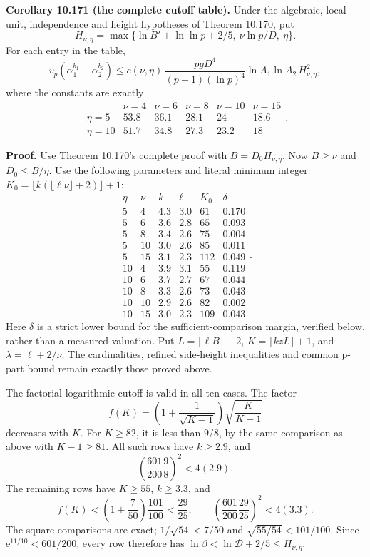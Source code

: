 \documentclass[
  11pt,
  a4paper,
]{article}
\begin{document}
\textbf{Corollary 10.171 (the complete cutoff table).} Under the
algebraic, local-unit, independence and height hypotheses of Theorem
10.170, put \[
H_{\nu,\eta}
=\max\{\ln B'+\ln\ln p+2/5,\ \nu\ln p/D,\ \eta\}.
\tag{10.629}
\] For each entry in the table, \[
v_p(\alpha_1^{b_1}-\alpha_2^{b_2})
\le c(\nu,\eta)\,
\frac{pgD^4}{(p-1)(\ln p)^4}
\ln A_1\ln A_2\,H_{\nu,\eta}^2,
\tag{10.630}
\] where the constants are exactly \[
\begin{array}{c|ccccc}
&\nu=4&\nu=6&\nu=8&\nu=10&\nu=15\\ \hline
\eta=5&53.8&36.1&28.1&24&18.6\\
\eta=10&51.7&34.8&27.3&23.2&18
\end{array}.
\tag{10.631}
\]

\textbf{Proof.} Use Theorem 10.170's complete proof with
\(B=D_0H_{\nu,\eta}\). Now \(B\ge\nu\) and \(D_0\le B/\eta\). Use the
following parameters and literal minimum integer
\(K_0=\lfloor k(\lfloor\ell\nu\rfloor+2)\rfloor+1\): \[
\begin{array}{cc|cc|r|c}
\eta&\nu&k&\ell&K_0&\delta\\ \hline
5&4&4.3&3.0&61&0.170\\
5&6&3.6&2.8&65&0.093\\
5&8&3.4&2.6&75&0.004\\
5&10&3.0&2.6&85&0.011\\
5&15&3.1&2.3&112&0.049\\
10&4&3.9&3.1&55&0.119\\
10&6&3.7&2.7&67&0.044\\
10&8&3.3&2.6&73&0.043\\
10&10&2.9&2.6&82&0.002\\
10&15&3.0&2.3&109&0.043
\end{array}.
\tag{10.632}
\] Here \(\delta\) is a strict lower bound for the sufficient-comparison
margin, verified below, rather than a measured valuation. Put
\(L=\lfloor\ell B\rfloor+2\), \(K=\lfloor kzL\rfloor+1\), and
\(\lambda=\ell+2/\nu\). The cardinalities, refined side-height
inequalities and common p-part bound remain exactly those proved above.

The factorial logarithmic cutoff is valid in all ten cases. The factor
\[
f(K)=\left(1+\frac1{\sqrt{K-1}}\right)\sqrt{\frac K{K-1}}
\tag{10.633}
\] decreases with \(K\). For \(K\ge82\), it is less than \(9/8\), by the
same comparison as above with \(K-1\ge81\). All such rows have
\(k\ge2.9\), and \[
\left(\frac{601}{200}\frac98\right)^2<4(2.9).
\tag{10.634}
\] The remaining rows have \(K\ge55\), \(k\ge3.3\), and \[
f(K)<\left(1+\frac7{50}\right)\frac{101}{100}
<\frac{29}{25},\qquad
\left(\frac{601}{200}\frac{29}{25}\right)^2<4(3.3).
\tag{10.635}
\] The square comparisons are exact; \(1/\sqrt{54}<7/50\) and
\(\sqrt{55/54}<101/100\). Since \(\mathrm e^{11/10}<601/200\), every row
therefore has \(\ln\beta<\ln\mathcal D+2/5\le H_{\nu,\eta}\).
\end{document}

